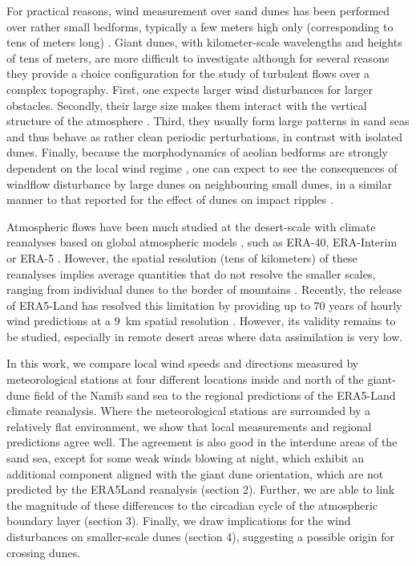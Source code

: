 For practical reasons, wind measurement over sand dunes has been performed over rather small bedforms, typically a few meters high only (corresponding to tens of meters long) \citep{Wiggs1996}. Giant dunes, with kilometer-scale wavelengths and heights of tens of meters, are more difficult to investigate although for several reasons they provide a choice configuration for the study of turbulent flows over a complex topography. First, one expects larger wind disturbances for larger obstacles. Secondly, their large size makes them interact with the vertical structure of the atmosphere \citep{Andreotti2009}. Third, they usually form large patterns in sand seas and thus behave as rather clean periodic perturbations, in contrast with isolated dunes. Finally, because the morphodynamics of aeolian bedforms are strongly dependent on the local wind regime \citep{Livingstone2019}, one can expect to see the consequences of windflow disturbance by large dunes on neighbouring small dunes, in a similar manner to that reported for the effect of dunes on impact ripples \citep{Howard1977,Hood2021}.

Atmospheric flows have been much studied at the desert-scale with climate reanalyses based on global atmospheric models \citep{Blumberg1996, Livingstone2010, Ashkenazy2012, Jolivet2021, Hu2021}, such as ERA-40, ERA-Interim or ERA-5 \citep{Uppala2005, Dee2011, Hersbach2020}. However, the spatial resolution (tens of kilometers) of these reanalyses implies average quantities that do not resolve the smaller scales, ranging from individual dunes to the border of mountains \citep{Livingstone2010}. Recently, the release of ERA5-Land has resolved this limitation by providing up to 70 years of hourly wind predictions at a $9$~km spatial resolution \citep{munoz2021}. However, its validity remains to be studied, especially in remote desert areas where data assimilation is very low.

In this work, we compare local wind speeds and directions measured by meteorological stations at four different locations inside and north of the giant-dune field of the Namib sand sea to the regional predictions of the ERA5-Land climate reanalysis. Where the meteorological stations are surrounded by a relatively flat environment, we show that local measurements and regional predictions agree well. The agreement is also good in the interdune areas of the sand sea, except for some weak winds blowing at night, which exhibit an additional component aligned with the giant dune orientation, which are not predicted by the ERA5Land reanalysis (section 2). Further, we are able to link the magnitude of these differences to the circadian cycle of the atmospheric boundary layer (section 3). Finally, we draw implications for the wind disturbances on smaller-scale dunes (section 4), suggesting a possible origin for crossing dunes.



